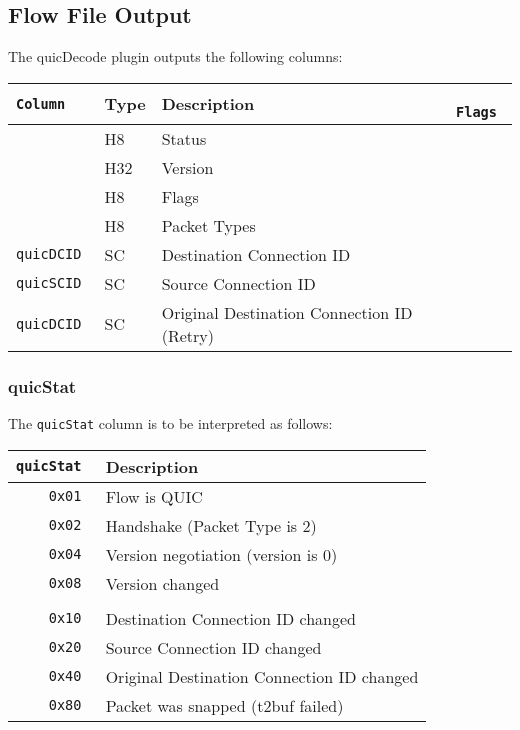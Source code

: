 \documentclass[documentation]{subfiles}
\begin{document}
\subsection{Flow File Output}
The quicDecode plugin outputs the following columns:
\begin{longtable}{>{\tt}lll>{\tt\small}l}
    \toprule
    {\bf Column} & {\bf Type} & {\bf Description} & {\bf Flags}\\
    \midrule\endhead%
    \nameref{quicStat}     & H8  & Status                                     & \\
    \nameref{quicVersion}  & H32 & Version                                    & \\
    \nameref{quicFlags}    & H8  & Flags                                      & \\
    \nameref{quicPktTypes} & H8  & Packet Types                               & \\
    quicDCID               & SC  & Destination Connection ID                  & \\
    quicSCID               & SC  & Source Connection ID                       & \\
    quicDCID               & SC  & Original Destination Connection ID (Retry) & \\
    \bottomrule
\end{longtable}

\subsubsection{quicStat}\label{quicStat}
The {\tt quicStat} column is to be interpreted as follows:
\begin{longtable}{>{\tt}rl}
    \toprule
    {\bf quicStat} & {\bf Description}\\
    \midrule\endhead%
    0x01 & Flow is QUIC\\
    0x02 & Handshake (Packet Type is 2)\\
    0x04 & Version negotiation (version is 0)\\
    0x08 & Version changed\\
    \\
    0x10 & Destination Connection ID changed\\
    0x20 & Source Connection ID changed\\
    0x40 & Original Destination Connection ID changed\\
    0x80 & Packet was snapped (t2buf failed)\\
    \bottomrule
\end{longtable}
\end{document}
